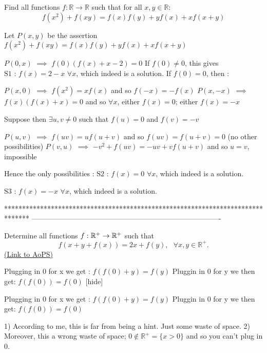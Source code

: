 \begin{solution}
	\begin{tcolorbox}Find all functions $f:\mathbb{R} \rightarrow \mathbb{R}$ such that for all $x,y \in \mathbb{R}$:
\[ f(x^2)+f(xy)=f(x)f(y)+yf(x)+xf(x+y) \]\end{tcolorbox}
Let $P(x,y)$ be the assertion $f(x^2)+f(xy)=f(x)f(y)+yf(x)+xf(x+y)$

$P(0,x)$ $\implies$ $f(0)(f(x)+x-2)=0$
If $f(0)\ne 0$, this gives $\boxed{\text{S1 : }f(x)=2-x}$ $\forall x$, which indeed is a solution.
If $f(0)=0$, then :

$P(x,0)$ $\implies$ $f(x^2)=xf(x)$ and so $f(-x)=-f(x)$
$P(x,-x)$ $\implies$ $f(x)(f(x)+x)=0$ and so $\forall x$, either $f(x)=0$; either $f(x)=-x$

Suppose then $\exists u,v\ne 0$ such that $f(u)=0$ and $f(v)=-v$

$P(u,v)$ $\implies$ $f(uv)=uf(u+v)$ and so $f(uv)=f(u+v)=0$ (no other possibilities)
$P(v,u)$ $\implies$ $-v^2+f(uv)=-uv+vf(u+v)$ and so $u=v$, impossible

Hence the only possibilities :
$\boxed{\text{S2 : }f(x)=0}$ $\forall x$, which indeed is a solution.

$\boxed{\text{S3 : }f(x)=-x}$ $\forall x$, which indeed is a solution.
\end{solution}
*******************************************************************************
-------------------------------------------------------------------------------

\begin{problem}
	Determine all functions $f: \Bbb{R}^+ \to \Bbb{R}^+$ such that \[\displaystyle{\displaystyle{  f(x+y+f(x))=2x+f(y)  , \ \ \ \forall x,y \in  \mathbb{R}^+. }}\]
	\flushright \href{https://artofproblemsolving.com/community/c6h609494}{(Link to AoPS)}
\end{problem}



\begin{solution} Plugging in 0 for x we get :
$f(f(0)+y) = f(y)$
Pluggin in 0 for y we then get:
$f(f(0)) = f(0)$
[\/hide]
\end{solution}



\begin{solution}
	\begin{tcolorbox} Plugging in 0 for x we get :
$f(f(0)+y) = f(y)$
Pluggin in 0 for y we then get:
$f(f(0)) = f(0)$
\end{tcolorbox}
1) According to me, this is far from being a hint. Just some waste of space.
2) Moreover, this a wrong waste of space; $0\notin\mathbb R^+=\{x>0\}$ and so you can't plug in $0$.
\end{solution}



